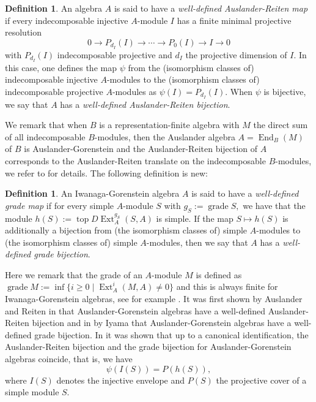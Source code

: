 \documentclass[a4paper]{amsart}
\theoremstyle{definition}
\newtheorem{definition}[theorem]{Definition}
\theoremstyle{remark}
\numberwithin{equation}{section}
\newcommand{\Ext}{\operatorname{Ext}}
\newcommand{\End}{\operatorname{End}}
\newcommand{\gr}{\operatorname{grade}}
\renewcommand{\top}{\operatorname{\mathrm{top}}}
\begin{document}
\begin{definition}
An algebra $A$ is said to have a \emph{well-defined Auslander-Reiten map} if every indecomposable injective $A$-module $I$ has a finite minimal projective resolution 
$$0 \rightarrow P_{d_I}(I) \rightarrow \cdots \rightarrow P_0(I) \rightarrow I \rightarrow 0$$
with $P_{d_I}(I)$ indecomposable projective and $d_I$ the projective dimension of $I$. In this case, one defines the map $\psi$ from the (isomorphism classes of) indecomposable injective $A$-modules to the (isomorphism classes of) indecomposable projective $A$-modules as $\psi(I)=P_{d_I}(I)$.
When $\psi$ is bijective, we say that $A$ has a \emph{well-defined Auslander-Reiten bijection}.
\end{definition}
We remark that when $B$ is a representation-finite algebra with $M$ the direct sum of all indecomposable $B$-modules, then the Auslander algebra $A=\End_B(M)$ of $B$ is Auslander-Gorenstein and the Auslander-Reiten bijection of $A$ corresponds to the Auslander-Reiten translate on the indecomposable $B$-modules, we refer to \cite{MTY} for details.
The following definition is new:

\begin{definition}
An Iwanaga-Gorenstein algebra $A$ is said to have a \emph{well-defined grade map} if for every simple $A$-module $S$ with $g_S:=\gr S,$ we have that the module $h(S):=\top D \Ext_A^{g_S}(S,A)$ is simple. If the map $S \mapsto h(S)$ is additionally a bijection from (the isomorphism classes of) simple $A$-modules to (the isomorphism classes of) simple $A$-modules, then we say that $A$ has a \emph{well-defined grade bijection}.  
\end{definition}
Here we remark that the grade of an $A$-module $M$ is defined as $\gr M:= \inf \{ i \geq 0 \mid \Ext_A^i(M,A) \neq 0\}$ and this is always finite for Iwanaga-Gorenstein algebras, see for example \cite[Lemma 2.2]{KMT}.
It was first shown by Auslander and Reiten in \cite{AR} that Auslander-Gorenstein algebras have a well-defined Auslander-Reiten bijection and in \cite{I2} by Iyama that Auslander-Gorenstein algebras have a well-defined grade bijection. In \cite{KMT} it was shown that up to a canonical identification, the Auslander-Reiten bijection and the grade bijection for Auslander-Gorenstein algebras coincide, that is, we have 
\begin{equation*}
 \psi(I(S))=P(h(S)),
\end{equation*} where $I(S)$ denotes the injective envelope and $P(S)$ the projective cover of a simple module $S$.
\end{document}
